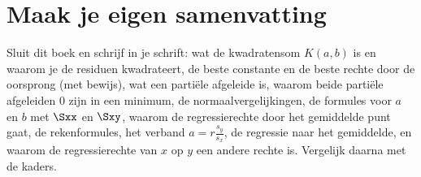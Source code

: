 
\begin{oefeningen}






\end{oefeningen}


\ifzelfstudie
\section*{Maak je eigen samenvatting}
Sluit dit boek en schrijf in je schrift: wat de kwadratensom $K(a, b)$ is en waarom je de residuen kwadrateert, de beste constante en de beste rechte door de oorsprong (met bewijs), wat een partiële afgeleide is, waarom beide partiële afgeleiden 0 zijn in een minimum, de normaalvergelijkingen, de formules voor $a$ en $b$ met $\Sxx$ en $\Sxy$, waarom de regressierechte door het gemiddelde punt gaat, de rekenformules, het verband $a = r\frac{s_y}{s_x}$, de regressie naar het gemiddelde, en waarom de regressierechte van $x$ op $y$ een andere rechte is. Vergelijk daarna met de kaders.
\fi
